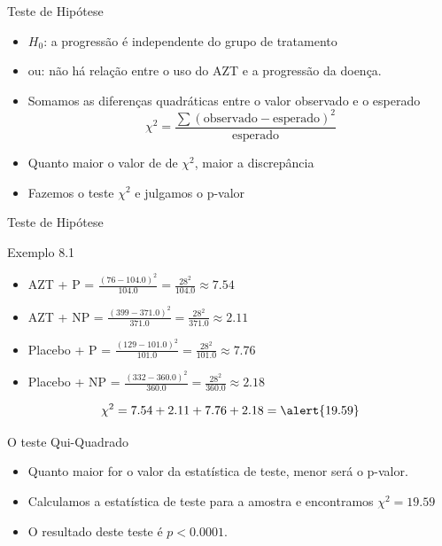 \documentclass{beamer}
\begin{document}
\begin{frame}{\scriptsize Teste de Hipótese}
  \begin{itemize}
    \footnotesize
  \item $H_0$: a progressão é independente do grupo de tratamento
  \item ou: não há relação entre o uso do AZT e a progressão da doença.
    \bigskip
    \scriptsize
  \item Somamos as diferenças quadráticas entre o valor observado
    e o esperado
    \begin{displaymath}
      \chi^2 = \frac{\sum (\text{observado} - \text{esperado})^2 }{\text{esperado}}
    \end{displaymath}
    \bigskip
    \footnotesize
  \item Quanto maior o valor de de $\chi^2$, maior a discrepância
  \item Fazemos o teste $\chi^2$ e julgamos o p-valor
  \end{itemize}
\end{frame}

\begin{frame}{\scriptsize Teste de Hipótese}
  \begin{exampleblock}{Exemplo 8.1}
    \begin{itemize}
      \scriptsize
    \item AZT + P = $\frac{(76 - 104.0)^2}{104.0} = \frac{28^2}{104.0}
      \approx 7.54$
    \item AZT + NP = $\frac{(399 - 371.0)^2}{371.0} =
      \frac{28^2}{371.0} \approx 2.11$
    \item Placebo + P = $\frac{(129 - 101.0)^2}{101.0} =
      \frac{28^2}{101.0} \approx 7.76$
    \item Placebo + NP = $\frac{(332 - 360.0)^2}{360.0} =
      \frac{28^2}{360.0} \approx 2.18$
    \end{itemize}
    \small
    \bigskip
    \begin{exampleblock}{}
    \footnotesize
      $$\chi^2 = 7.54 + 2.11 + 7.76 + 2.18 = \alert{19.59}$$
    \end{exampleblock}
  \end{exampleblock}
\end{frame}

\begin{frame}{\scriptsize O teste Qui-Quadrado}
  \begin{itemize}
    \footnotesize
  \item Quanto \alert{maior} for o valor da estatística de teste,
    \alert{menor} será o p-valor.
  \item Calculamos a estatística de teste para a amostra e encontramos
    $\chi^2 = 19.59$
  \item O resultado deste teste é $p<0.0001$.
  \end{itemize}
\end{frame}
\end{document}
